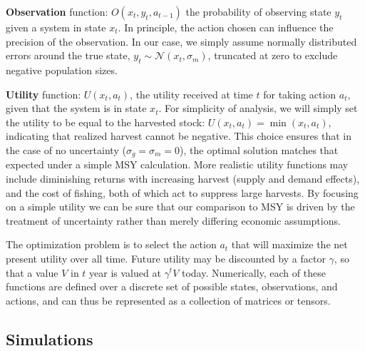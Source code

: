 \documentclass[3p]{elsarticle} %
\begin{document}
\textbf{Observation} function: \(O(x_t,y_t,a_{t-1})\) the probability of
observing state \(y_t\) given a system in state \(x_t\). In principle,
the action chosen can influence the precision of the observation. In our
case, we simply assume normally distributed errors around the true
state, \(y_t \sim \mathcal{N}(x_t, \sigma_m)\), truncated at zero to
exclude negative population sizes.

\textbf{Utility} function: \(U(x_t,a_t)\), the utility received at time
\(t\) for taking action \(a_t\), given that the system is in state
\(x_t\). For simplicity of analysis, we will simply set the utility to
be equal to the harvested stock: \(U(x_t, a_t) = \min(x_t, a_t)\),
indicating that realized harvest cannot be negative. This choice ensures
that in the case of no uncertainty (\(\sigma_g = \sigma_m = 0\)), the
optimal solution matches that expected under a simple MSY calculation.
More realistic utility functions may include diminishing returns with
increasing harvest (supply and demand effects), and the cost of fishing,
both of which act to suppress large harvests. By focusing on a simple
utility we can be sure that our comparison to MSY is driven by the
treatment of uncertainty rather than merely differing economic
assumptions.

The optimization problem is to select the action \(a_t\) that will
maximize the net present utility over all time. Future utility may be
discounted by a factor \(\gamma\), so that a value \(V\) in \(t\) year
is valued at \(\gamma^t V\) today. Numerically, each of these functions
are defined over a discrete set of possible states, observations, and
actions, and can thus be represented as a collection of matrices or
tensors.

\hypertarget{simulations}{%
\subsection{Simulations}\label{simulations}}
\end{document}
